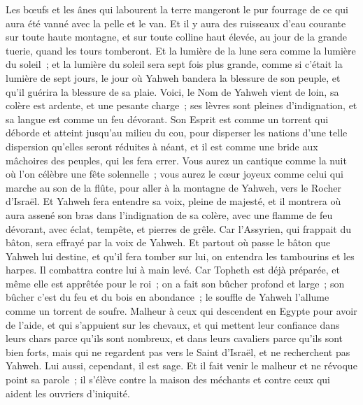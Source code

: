 \begin{multicols}{2}
Les bœufs et les ânes qui labourent la terre mangeront le pur fourrage de ce qui aura été vanné avec la pelle et le van.
Et il y aura des ruisseaux d'eau courante sur toute haute montagne, et sur toute colline haut élevée, au jour de la grande tuerie, quand les tours tomberont.
Et la lumière de la lune sera comme la lumière du soleil~; et la lumière du soleil sera sept fois plus grande, comme si c'était la lumière de sept jours, le jour où Yahweh bandera la blessure de son peuple, et qu'il guérira la blessure de sa plaie.
Voici, le Nom de Yahweh vient de loin, sa colère est ardente, et une pesante charge~; ses lèvres sont pleines d'indignation, et sa langue est comme un feu dévorant.
Son Esprit est comme un torrent qui déborde et atteint jusqu'au milieu du cou, pour disperser les nations d'une telle dispersion qu'elles seront réduites à néant, et il est comme une bride aux mâchoires des peuples, qui les fera errer.
Vous aurez un cantique comme la nuit où l'on célèbre une fête solennelle~; vous aurez le cœur joyeux comme celui qui marche au son de la flûte, pour aller à la montagne de Yahweh, vers le Rocher d'Israël.
Et Yahweh fera entendre sa voix, pleine de majesté, et il montrera où aura assené son bras dans l'indignation de sa colère, avec une flamme de feu dévorant, avec éclat, tempête, et pierres de grêle.
Car l'Assyrien, qui frappait du bâton, sera effrayé par la voix de Yahweh.
Et partout où passe le bâton que Yahweh lui destine, et qu'il fera tomber sur lui, on entendra les tambourins et les harpes. Il combattra contre lui à main levé.
Car Topheth est déjà préparée, et même elle est apprêtée pour le roi~; on a fait son bûcher profond et large~; son bûcher c'est du feu et du bois en abondance~; le souffle de Yahweh l'allume comme un torrent de soufre.
\VerseOne{}Malheur à ceux qui descendent en Egypte pour avoir de l'aide, et qui s'appuient sur les chevaux, et qui mettent leur confiance dans leurs chars parce qu'ils sont nombreux, et dans leurs cavaliers parce qu'ils sont bien forts, mais qui ne regardent pas vers le Saint d'Israël, et ne recherchent pas Yahweh.
Lui aussi, cependant, il est sage. Et il fait venir le malheur et ne révoque point sa parole~; il s'élève contre la maison des méchants et contre ceux qui aident les ouvriers d'iniquité.

\end{multicols}
